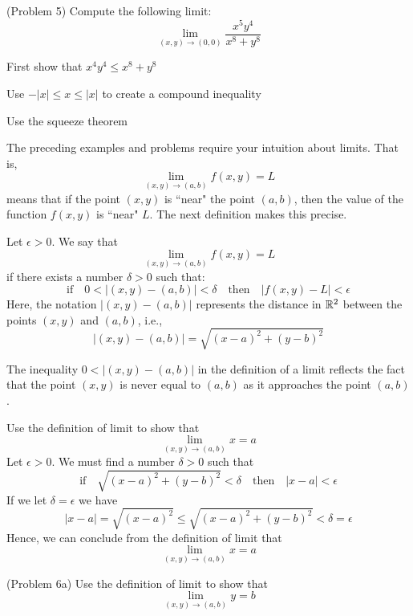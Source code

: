 \documentclass[handout]{ximera}
\begin{document}
\begin{problem}(Problem 5)
Compute the following limit:
\[
\lim_{(x,y) \to (0,0)} \frac{x^5y^4}{x^8 + y^8}
\]
\begin{hint}
First show that $x^4y^4 \leq x^8 + y^8$
\end{hint}
\begin{hint}
Use $-|x| \leq x \leq |x|$ to create a compound inequality
\end{hint}
\begin{hint}
Use the squeeze theorem
\end{hint}
\end{problem}
The preceding examples and problems require your intuition about limits.  That is,
\[
\lim_{(x,y) \to (a,b)} f(x,y) = L
\]
means that if the point $(x,y)$ is ``near" the point $(a,b)$, then the value of the function $f(x, y)$ is ``near" $L$.
The next definition makes this precise.


\begin{definition}[Limit]
Let $\epsilon > 0$. We say that
\[
\lim_{(x,y) \to (a,b)} f(x,y) = L
\]
if there exists a number $\delta >0$ such that:
\[
\text{if} \quad 0< \left|(x,y) - (a,b)\right| < \delta \quad \text{then} \quad \left|f(x,y) - L\right| < \epsilon
\]
Here, the notation $|(x,y) - (a,b)|$ represents the distance in $\mathbb R^2$ between the points $(x,y)$ and $(a,b)$, i.e.,
\[
|(x,y) - (a,b)| = \sqrt{(x-a)^2 + (y-b)^2}
\]
\end{definition}

\begin{remark}
The inequality $0< |(x,y) - (a,b)|$ in the definition of a limit reflects the fact that the point $(x,y)$ is never equal to $(a,b)$
as it approaches the point $(a,b)$.
\end{remark}

\begin{example}[Example 6]
Use the definition of limit to show that 
\[
\lim_{(x,y) \to (a,b)} x = a
\]
Let $\epsilon >0$.  We must find a number $\delta >0$ such that
\[
\text{if} \quad \sqrt{(x-a)^2 + (y-b)^2} < \delta \quad \text{then} \quad |x-a| < \epsilon
\]
If we let $\delta = \epsilon$ we have
\[
|x-a| = \sqrt{(x-a)^2} \leq \sqrt{(x-a)^2 + (y-b)^2} < \delta = \epsilon
\]
Hence, we can conclude from the definition of limit that
\[
\lim_{(x,y) \to (a,b)} x = a
\]
\end{example}

\begin{problem}(Problem 6a)
Use the definition of limit to show that 
\[
\lim_{(x,y) \to (a,b)} y = b
\]
\end{problem}
\end{document}
